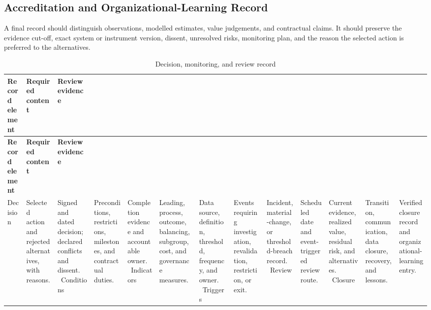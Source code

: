 \subsection{Accreditation and Organizational-Learning Record}
\label{sec:comp-ch05-supp-3}
A final record should distinguish observations, modelled estimates, value
judgements, and contractual claims. It should preserve the evidence cut-off, exact
system or instrument version, dissent, unresolved risks, monitoring plan, and the
reason the selected action is preferred to the alternatives.

\begin{longtable}{@{}p{}p{}p{}@{}}
\caption{Decision, monitoring, and review record}
\label{tab:comp-ch05-decision-record}\\
\toprule
\textbf{Record element} & \textbf{Required content} & \textbf{Review evidence} \\
\midrule
\endfirsthead
\toprule
\textbf{Record element} & \textbf{Required content} & \textbf{Review evidence} \\
\midrule
\endhead
\bottomrule
\endlastfoot
Decision & Selected action and rejected alternatives, with reasons. & Signed and dated decision; declared conflicts and dissent. \
Conditions & Preconditions, restrictions, milestones, and contractual duties. & Completion evidence and accountable owner. \
Indicators & Leading, process, outcome, balancing, subgroup, cost, and governance measures. & Data source, definition, threshold, frequency, and owner. \
Triggers & Events requiring investigation, revalidation, restriction, or exit. & Incident, material-change, or threshold-breach record. \
Review & Scheduled date and event-triggered review route. & Current evidence, realized value, residual risk, and alternatives. \
Closure & Transition, communication, data closure, recovery, and lessons. & Verified closure record and organizational-learning entry. \
\end{longtable}
